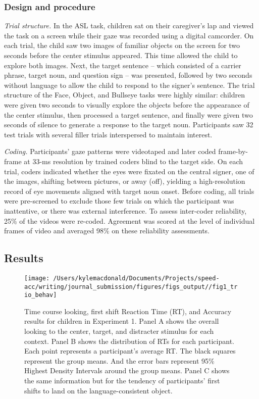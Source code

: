 \documentclass[,man,floatsintext]{apa6}
\begin{document}
\hypertarget{design-and-procedure}{%
\subsubsection{Design and procedure}\label{design-and-procedure}}

\emph{Trial structure.} In the ASL task, children sat on their caregiver's lap and viewed the task on a screen while their gaze was recorded using a digital camcorder. On each trial, the child saw two images of familiar objects on the screen for two seconds before the center stimulus appeared. This time allowed the child to explore both images. Next, the target sentence -- which consisted of a carrier phrase, target noun, and question sign -- was presented, followed by two seconds without language to allow the child to respond to the signer's sentence. The trial structure of the Face, Object, and Bullseye tasks were highly similar: children were given two seconds to visually explore the objects before the appearance of the center stimulus, then processed a target sentence, and finally were given two seconds of silence to generate a response to the target noun. Participants saw 32 test trials with several filler trials interspersed to maintain interest.

\emph{Coding.} Participants' gaze patterns were videotaped and later coded frame-by-frame at 33-ms resolution by trained coders blind to the target side. On each trial, coders indicated whether the eyes were fixated on the central signer, one of the images, shifting between pictures, or away (off), yielding a high-resolution record of eye movements aligned with target noun onset. Before coding, all trials were pre-screened to exclude those few trials on which the participant was inattentive, or there was external interference. To assess inter-coder reliability, 25\% of the videos were re-coded. Agreement was scored at the level of individual frames of video and averaged 98\% on these reliability assessments.

\hypertarget{results}{%
\subsection{Results}\label{results}}

\begin{figure}[!ht]

{\centering \texttt{[image: /Users/kylemacdonald/Documents/Projects/speed-acc/writing/journal\_submission/figures/figs\_output//fig1\_trio\_behav]} 

}

\caption{Time course looking, first shift Reaction Time (RT), and Accuracy results for children in Experiment 1. Panel A shows the overall looking to the center, target, and distracter stimulus for each context. Panel B shows the distribution of RTs for each participant. Each point represents a participant's average RT. The black squares represent the group means. And the error bars represent 95\% Highest Density Intervals around the group means. Panel C shows the same information but for the tendency of participants' first shifts to land on the language-consistent object.}\label{fig:speed-acc-trio-plot}
\end{figure}
\end{document}
